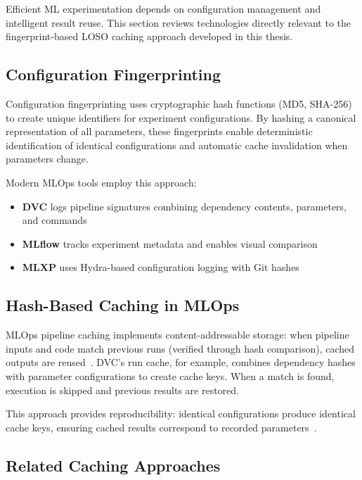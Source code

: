 \documentclass{imc-inf} %
\begin{document}
Efficient ML experimentation depends on configuration management and intelligent 
result reuse. This section reviews technologies directly relevant to the 
fingerprint-based LOSO caching approach developed in this thesis.

\subsection{Configuration Fingerprinting}

Configuration fingerprinting uses cryptographic hash functions (MD5, SHA-256) 
to create unique identifiers for experiment configurations. By hashing a 
canonical representation of all parameters, these fingerprints enable 
deterministic identification of identical configurations and automatic 
cache invalidation when parameters change.

Modern MLOps tools employ this approach:
\begin{itemize}
\item \textbf{DVC} logs pipeline signatures combining dependency contents, 
      parameters, and commands~\cite{dvc2022inproceedings}
\item \textbf{MLflow} tracks experiment metadata and enables visual 
      comparison~\cite{zaharia2018mlflow}
\item \textbf{MLXP} uses Hydra-based configuration logging with Git 
      hashes~\cite{arbel2024mlxp}
\end{itemize}

\subsection{Hash-Based Caching in MLOps}

MLOps pipeline caching implements content-addressable storage: when pipeline 
inputs and code match previous runs (verified through hash comparison), 
cached outputs are reused~\cite{dvc2022inproceedings}. DVC's run cache, 
for example, combines dependency hashes with parameter configurations to 
create cache keys. When a match is found, execution is skipped and previous 
results are restored.

This approach provides reproducibility: identical configurations produce 
identical cache keys, ensuring cached results correspond to recorded 
parameters~\cite{schubotz2022caching}.

\subsection{Related Caching Approaches}
\end{document}

